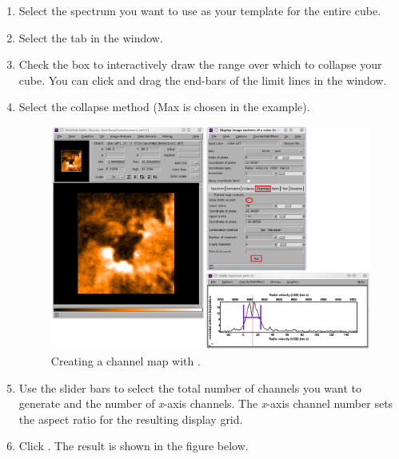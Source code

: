 \documentclass[11pt,oneside,chapters]{starlink}
\begin{document}
\begin{enumerate}[label=(\textbf{\arabic*})]
\item  Select the spectrum you want to use as your template for the entire cube.

\item Select the  tab in the  window.

\item Check the  box to interactively
draw the range over which to collapse your cube. You can click and
drag the end-bars of the limit lines in the 
window.

\item Select the collapse method (Max is chosen in the example).

\begin{figure}[h!]
\begin{center}
\includegraphics[width=0.93\linewidth]{sc20_gaia_channel1}
\caption[Creating a channel map with \gaia.]{\label{fig:gaia_chan1}
  Creating a channel map with \gaia.}
\end{center}
\end{figure}

\item Use the slider bars to select the total number of channels you
want to generate and the number of \textit{x}-axis channels. The
\textit{x}-axis channel number sets the aspect ratio for the resulting
display grid.

\item Click . The result is shown in the figure below.


\end{enumerate}
\end{document}
